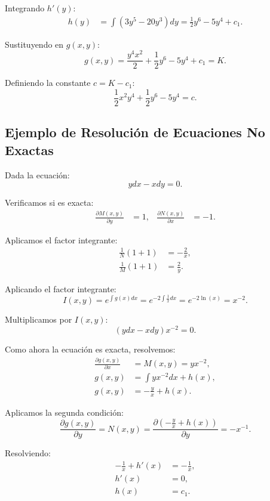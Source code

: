 \noindent Integrando \( h'(y) \):
\begin{align*}
h( y) &= \int ( 3y^{5} -20y^{3}) dy = \frac{1}{2} y^{6} -5y^{4} + c_{1}.
\end{align*}

\noindent Sustituyendo en \( g( x,y) \):
\[
g( x,y) = \frac{y^{4} x^{2}}{2} + \frac{1}{2} y^{6} -5y^{4} + c_{1} = K.
\]

\noindent Definiendo la constante \( c = K - c_{1} \):
\[
\frac{1}{2} x^{2} y^{4} + \frac{1}{2} y^{6} -5y^{4} = c.
\]

\subsection{Ejemplo de Resolución de Ecuaciones No Exactas}
Dada la ecuación:
\[
ydx - xdy = 0.
\]

\noindent Verificamos si es exacta:
\begin{align*}
\frac{\partial M( x,y)}{\partial y} &= 1, & \frac{\partial N( x,y)}{\partial x} &= -1.
\end{align*}

\noindent Aplicamos el factor integrante:
\begin{align*}
\frac{1}{N} ( 1+1) &= -\frac{2}{x}, \\
\frac{1}{M} ( 1+1) &= \frac{2}{y}.
\end{align*}

\noindent Aplicando el factor integrante:
\[
I( x,y) = e^{\int g( x) dx} = e^{-2\int \frac{1}{x} dx} = e^{-2\ln( x)} = x^{-2}.
\]

\noindent Multiplicamos por \( I(x,y) \):
\[
(y dx - x dy) x^{-2} = 0.
\]

\noindent Como ahora la ecuación es exacta, resolvemos:
\begin{align*}
\frac{\partial g( x,y)}{\partial x} &= M( x,y) = yx^{-2}, \\
g( x,y) &= \int yx^{-2} dx + h( x), \\
g( x,y) &= -\frac{y}{x} + h( x).
\end{align*}

\noindent Aplicamos la segunda condición:
\[
\frac{\partial g( x,y)}{\partial y} = N( x,y) = \frac{\partial ( -\frac{y}{x} + h( x))}{\partial y} = -x^{-1}.
\]

\noindent Resolviendo:
\begin{align*}
-\frac{1}{x} + h'( x) &= -\frac{1}{x}, \\
h'( x) &= 0, \\
h( x) &= c_{1}.
\end{align*}

